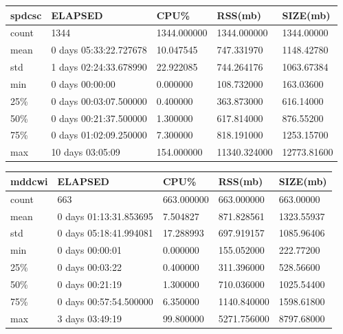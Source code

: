 \documentclass{article}
\begin{document}
\begin{tabular}{|l|l|l|l|l|}
\hline 
\hline spdcsc& ELAPSED&    CPU\%&   RSS(mb)&  SIZE(mb) \\
\hline count&   1344& 1344.000000&  1344.000000&  1344.00000 \\
\hline mean&  0 days 05:33:22.727678&  10.047545&  747.331970&  1148.42780 \\
\hline std&  1 days 02:24:33.678990&  22.922085&  744.264176&  1063.67384 \\
\hline min&   0 days 00:00:00&   0.000000&  108.732000&  163.03600 \\
\hline 25\%&  0 days 00:03:07.500000&   0.400000&  363.873000&  616.14000 \\
\hline 50\%&  0 days 00:21:37.500000&   1.300000&  617.814000&  876.55200 \\
\hline 75\%&  0 days 01:02:09.250000&   7.300000&  818.191000&  1253.15700 \\
\hline max&  10 days 03:05:09&  154.000000& 11340.324000& 12773.81600 \\
\hline 
\end{tabular}
 
\begin{tabular}{|l|l|l|l|l|}
\hline 
\hline mddcwi& ELAPSED&   CPU\%&  RSS(mb)&   SIZE(mb) \\
\hline count&    663& 663.000000&  663.000000&  663.00000 \\
\hline mean&  0 days 01:13:31.853695&  7.504827&  871.828561& 1323.55937 \\
\hline std&  0 days 05:18:41.994081&  17.288993&  697.919157& 1085.96406 \\
\hline min&   0 days 00:00:01&  0.000000&  155.052000&  222.77200 \\
\hline 25\%&   0 days 00:03:22&  0.400000&  311.396000&  528.56600 \\
\hline 50\%&   0 days 00:21:19&  1.300000&  710.036000& 1025.54400 \\
\hline 75\%&  0 days 00:57:54.500000&  6.350000& 1140.840000& 1598.61800 \\
\hline max&   3 days 03:49:19&  99.800000& 5271.756000& 8797.68000 \\
\hline 
\end{tabular}
 
\end{document}
